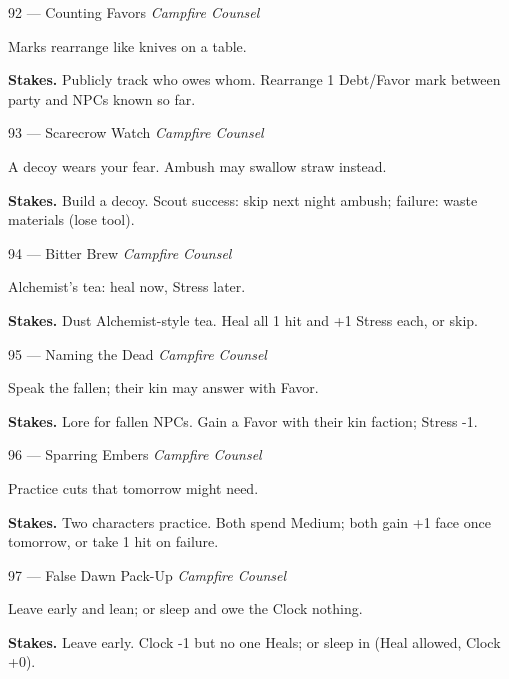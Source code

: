 \begin{encounterentry}{92 --- Counting Favors}
\textit{Campfire Counsel}

Marks rearrange like knives on a table.

\textbf{Stakes.} Publicly track who owes whom. Rearrange 1 Debt/Favor mark between party and NPCs known so far.
\end{encounterentry}

\begin{encounterentry}{93 --- Scarecrow Watch}
\textit{Campfire Counsel}

A decoy wears your fear. Ambush may swallow straw instead.

\textbf{Stakes.} Build a decoy. Scout success: skip next night ambush; failure: waste materials (lose tool).
\end{encounterentry}

\begin{encounterentry}{94 --- Bitter Brew}
\textit{Campfire Counsel}

Alchemist's tea: heal now, Stress later.

\textbf{Stakes.} Dust Alchemist-style tea. Heal all 1 hit and +1 Stress each, or skip.
\end{encounterentry}

\begin{encounterentry}{95 --- Naming the Dead}
\textit{Campfire Counsel}

Speak the fallen; their kin may answer with Favor.

\textbf{Stakes.} Lore for fallen NPCs. Gain a Favor with their kin faction; Stress -1.
\end{encounterentry}

\begin{encounterentry}{96 --- Sparring Embers}
\textit{Campfire Counsel}

Practice cuts that tomorrow might need.

\textbf{Stakes.} Two characters practice. Both spend Medium; both gain +1 face once tomorrow, or take 1 hit on failure.
\end{encounterentry}

\begin{encounterentry}{97 --- False Dawn Pack-Up}
\textit{Campfire Counsel}

Leave early and lean; or sleep and owe the Clock nothing.

\textbf{Stakes.} Leave early. Clock -1 but no one Heals; or sleep in (Heal allowed, Clock +0).
\end{encounterentry}

